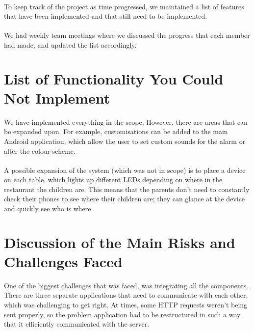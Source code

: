 \documentclass{article}
\begin{document}
\paragraph{}To keep track of the project as time progressed, we maintained a list of features that have been implemented and that still need to be implemented. 
\paragraph{}We had weekly team meetings where we discussed the progress that each member had made, and updated the list accordingly.

\section{List of Functionality You Could Not Implement}
\paragraph{}We have implemented everything in the scope. However, there are areas that can be expanded upon. For example, customisations can be added to the main Android application, which allow the user to set custom sounds for the alarm or alter the colour scheme.

\paragraph{}A possible expansion of the system (which was not in scope) is to place a device on each table, which lights up different LEDs depending on where in the restaurant the children are. This means that the parents don't need to constantly check their phones to see where their children are; they can glance at the device and quickly see who is where.


\section{Discussion of the Main Risks and Challenges Faced}
\paragraph{}One of the biggest challenges that was faced, was integrating all the components. There are three separate applications that need to communicate with each other, which was challenging to get right. At times, some HTTP requests weren't being sent properly, so the problem application had to be restructured in such a way that it efficiently communicated with the server.
\end{document}
